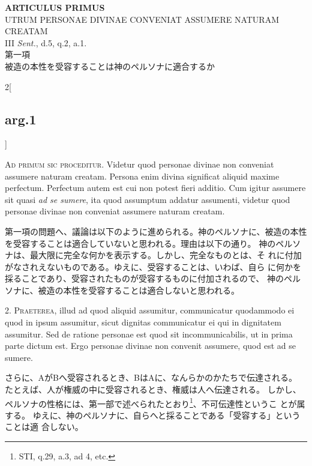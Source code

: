 \documentclass[paper=a4paper,fontsize=10pt,jafontsize=9pt,titlepage]{jlreq}
\begin{document}
\begin{center}
 {\Large {\bfseries ARTICULUS PRIMUS}}\\
 {\large UTRUM PERSONAE DIVINAE CONVENIAT ASSUMERE NATURAM CREATAM}\\
 {\footnotesize III {\itshape Sent.}, d.5, q.2, a.1.}\\
 {\Large 第一項\\被造の本性を受容することは神のペルソナに適合するか}
\end{center}

\begin{paracol}{2}[\subsection{arg.1}]

{\scshape Ad primum sic proceditur}. Videtur quod personae divinae non conveniat
assumere naturam creatam. Persona enim divina significat aliquid maxime
perfectum. Perfectum autem est cui non potest fieri additio. Cum igitur
assumere sit quasi {\itshape ad se sumere}, ita quod assumptum addatur assumenti,
videtur quod personae divinae non conveniat assumere naturam creatam.

\switchcolumn

第一項の問題へ、議論は以下のように進められる。神のペルソナに、被造の本性
 を受容することは適合していないと思われる。理由は以下の通り。
神のペルソナは、最大限に完全な何かを表示する。しかし、完全なものとは、そ
 れに付加がなされえないものである。ゆえに、受容することは、いわば、自ら
 に何かを採ることであり、受容されたものが受容するものに付加されるので、
 神のペルソナに、被造の本性を受容することは適合しないと思われる。


2. {\scshape Praeterea}, illud ad quod aliquid assumitur, communicatur quodammodo ei
quod in ipsum assumitur, sicut dignitas communicatur ei qui in
dignitatem assumitur. Sed de ratione personae est quod sit
incommunicabilis, ut in prima parte dictum est. Ergo personae divinae
non convenit assumere, quod est ad se sumere.

\switchcolumn

さらに、AがBへ受容されるとき、BはAに、なんらかのかたちで伝達される。
たとえば、人が権威の中に受容されるとき、権威は人へ伝達される。
しかし、ペルソナの性格には、第一部で述べられたとおり\footnote{STI, q.29,
 a.3, ad 4, etc.}、不可伝達性というこ
 とが属する。
ゆえに、神のペルソナに、自らへと採ることである「受容する」ということは適
 合しない。


\end{paracol}
\end{document}
